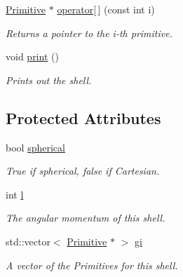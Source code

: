 \begin{DoxyCompactItemize}
\hyperlink{classJKBuilder_1_1Primitive}{Primitive} $\ast$ \hyperlink{classJKBuilder_1_1Shell_ae98a68bcb237e53c8c063aded1b34f2e}{operator\mbox{[}$\,$\mbox{]}} (const int i)
\begin{DoxyCompactList}\small\item\em Returns a pointer to the i-\/th primitive. \item\end{DoxyCompactList}\item 
void \hyperlink{classJKBuilder_1_1Shell_a388f572c62279f839ee138a9afbdeeb5}{print} ()
\begin{DoxyCompactList}\small\item\em Prints out the shell. \item\end{DoxyCompactList}\end{DoxyCompactItemize}
\subsection*{Protected Attributes}
\begin{DoxyCompactItemize}
\item 
bool \hyperlink{classJKBuilder_1_1Shell_a8a5f217a40aac0ce092effdd9b6db9f6}{spherical}
\begin{DoxyCompactList}\small\item\em True if spherical, false if Cartesian. \item\end{DoxyCompactList}\item 
int \hyperlink{classJKBuilder_1_1Shell_a89606eca6b563ec68d2da2e84657736f}{l}
\begin{DoxyCompactList}\small\item\em The angular momentum of this shell. \item\end{DoxyCompactList}\item 
std::vector$<$ \hyperlink{classJKBuilder_1_1Primitive}{Primitive} $\ast$ $>$ \hyperlink{classJKBuilder_1_1Shell_afd0049f3a997082e636f4dae72879da2}{gi}
\begin{DoxyCompactList}\small\item\em A vector of the Primitives for this shell. \item\end{DoxyCompactList}\end{DoxyCompactItemize}


